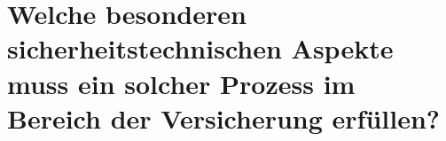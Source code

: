 \chapter{Welche besonderen sicherheitstechnischen Aspekte muss ein solcher Prozess im Bereich der Versicherung erfüllen?}